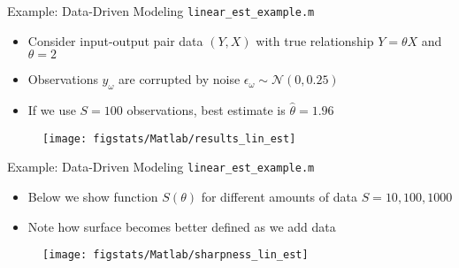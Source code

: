 \documentclass[9pt]{beamer}
\begin{document}
%
\begin{frame}{Example: Data-Driven Modeling \footnotesize{\texttt{linear\_est\_example.m}}}

\begin{block}{}
\begin{itemize}
\setlength{\itemsep}{10pt}
\item Consider input-output pair data $(Y,X)$ with true relationship $Y=\theta X$ and $\theta=2$
\item Observations $y_\omega$ are corrupted by noise $\epsilon_\omega  \sim \mathcal{N}(0,0.25)$
\item If we use $S=100$ observations, best estimate is $\hat{\theta}=1.96$ 
\end{itemize}
\end{block}

\begin{figure}[!htb]
    \centering
	\texttt{[image: figstats/Matlab/results\_lin\_est]}
\end{figure}

\end{frame}

%
\begin{frame}{Example: Data-Driven Modeling \footnotesize{\texttt{linear\_est\_example.m}}}

\begin{block}{}
\begin{itemize}
\setlength{\itemsep}{5pt}
\item Below we show function $S(\theta)$ for different amounts of data $S=10,100,1000$
\item Note how surface becomes better defined as we add data
\end{itemize}
\end{block}

\begin{figure}[!htb]
    \centering
	\texttt{[image: figstats/Matlab/sharpness\_lin\_est]}
\end{figure}

\end{frame}
\end{document}
